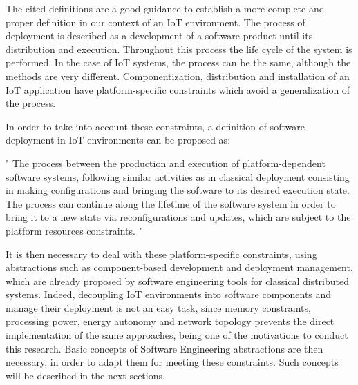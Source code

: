 The cited definitions are a good guidance to establish a more complete and proper definition in our context of an IoT environment.
The process of deployment is described as a development of a software product until its distribution and execution.
Throughout this process the life cycle of the system is performed.
In the case of IoT systems, the process can be the same, although the methods are very different.
Componentization, distribution and installation of an IoT application have platform-specific constraints which avoid a generalization of the process.

In order to take into account these constraints, a definition of software deployment in IoT environments can be proposed as:
\begin{citeverbatim}
	" The process between the production and execution of platform-dependent software systems, following similar activities as in classical deployment consisting in making configurations and bringing the software to its desired execution state. The process can continue along the lifetime of the software system in order to bring it to a new state via reconfigurations and updates, which are subject to the platform resources constraints. "
\end{citeverbatim}
It is then necessary to deal with these platform-specific constraints, using abstractions such as component-based development and deployment management, which are already proposed by software engineering tools for classical distributed systems.
Indeed, decoupling IoT environments into software components and manage their deployment is not an easy task, since memory constraints, processing power, energy autonomy and network topology prevents the direct implementation of the same approaches, being one of the motivations to conduct this research.
Basic concepts of Software Engineering abstractions are then necessary, in order to adapt them for meeting these constraints.
Such concepts will be described in the next sections.

